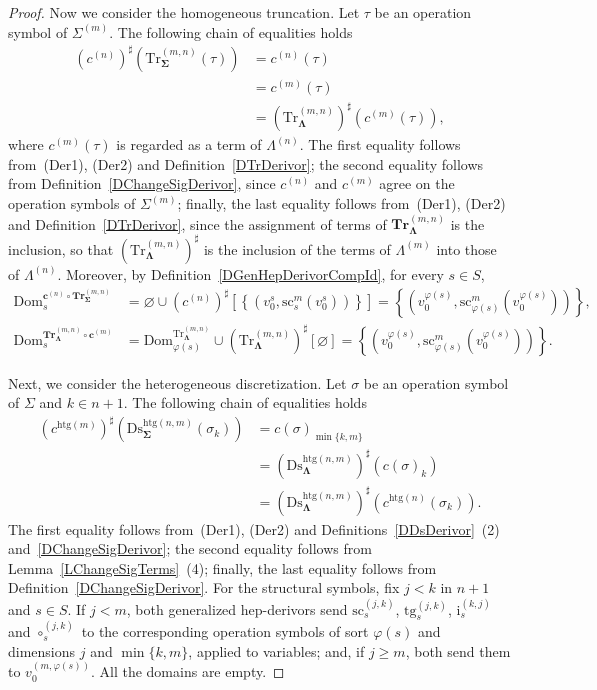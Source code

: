 \documentclass[a4paper, reqno]{amsbook}
\newcommand{\sig}[1]{\mathbf{#1}}             %
\newcommand{\Dom}{\mathrm{Dom}}
\newcommand{\htg}{\mathrm{htg}}                %
\newcommand{\src}{\mathrm{sc}}
\newcommand{\tgt}{\mathrm{tg}}
\newcommand{\Ds}{\mathrm{Ds}}
\newcommand{\Tr}{\mathrm{Tr}}
\newcommand{\bTr}{\mathbf{Tr}}
\theoremstyle{plain}
\theoremstyle{definition}
\begin{document}
\begin{proof}
Now we consider the homogeneous truncation.
Let $\tau$ be an operation symbol of $\Sigma^{(m)}$.
The following chain of equalities holds
\begin{align*}
(c^{(n)})^{\sharp}\left(\Tr^{(m,n)}_{\sig{\Sigma}}(\tau)\right)
&=
c^{(n)}(\tau)
\tag{4}
\\&=
c^{(m)}(\tau)
\tag{5}
\\&=
(\Tr^{(m,n)}_{\sig{\Lambda}})^{\sharp}\left(c^{(m)}(\tau)\right),
\tag{6}
\end{align*}
where $c^{(m)}(\tau)$ is regarded as a term of $\Lambda^{(n)}$.
The first equality follows from~(Der1), (Der2) and Definition~\ref{DTrDerivor}; the second equality follows from Definition~\ref{DChangeSigDerivor}, since $c^{(n)}$ and $c^{(m)}$ agree on the operation symbols of $\Sigma^{(m)}$; finally, the last equality follows from~(Der1), (Der2) and Definition~\ref{DTrDerivor}, since the assignment of terms of $\bTr^{(m,n)}_{\sig{\Lambda}}$ is the inclusion, so that $(\Tr^{(m,n)}_{\sig{\Lambda}})^{\sharp}$ is the inclusion of the terms of $\Lambda^{(m)}$ into those of $\Lambda^{(n)}$.
Moreover, by Definition~\ref{DGenHepDerivorCompId}, for every $s\in S$,
\begin{align*}
\Dom^{\mathbf{c}^{(n)}\circ\bTr^{(m,n)}_{\sig{\Sigma}}}_{s}
&=
\varnothing\cup(c^{(n)})^{\sharp}\left[\left\lbrace\left(v^{s}_{0},\src^{m}_{s}(v^{s}_{0})\right)\right\rbrace\right]
=
\left\lbrace\left(v^{\varphi(s)}_{0},\src^{m}_{\varphi(s)}(v^{\varphi(s)}_{0})\right)\right\rbrace,
\\
\Dom^{\bTr^{(m,n)}_{\sig{\Lambda}}\circ\mathbf{c}^{(m)}}_{s}
&=
\Dom^{\Tr^{(m,n)}_{\sig{\Lambda}}}_{\varphi(s)}\cup(\Tr^{(m,n)}_{\sig{\Lambda}})^{\sharp}[\varnothing]
=
\left\lbrace\left(v^{\varphi(s)}_{0},\src^{m}_{\varphi(s)}(v^{\varphi(s)}_{0})\right)\right\rbrace.
\end{align*}

Next, we consider the heterogeneous discretization.
Let $\sigma$ be an operation symbol of $\Sigma$ and $k\in n+1$.
The following chain of equalities holds
\begin{align*}
(c^{\htg(m)})^{\sharp}\left(\Ds^{\htg(n,m)}_{\sig{\Sigma}}(\sigma_{k})\right)
&=
c(\sigma)_{\min\{k,m\}}
\tag{7}
\\&=
(\Ds^{\htg(n,m)}_{\sig{\Lambda}})^{\sharp}\left(c(\sigma)_{k}\right)
\tag{8}
\\&=
(\Ds^{\htg(n,m)}_{\sig{\Lambda}})^{\sharp}\left(c^{\htg(n)}(\sigma_{k})\right).
\tag{9}
\end{align*}
The first equality follows from~(Der1), (Der2) and Definitions~\ref{DDsDerivor}~(2) and~\ref{DChangeSigDerivor}; the second equality follows from Lemma~\ref{LChangeSigTerms}~(4); finally, the last equality follows from Definition~\ref{DChangeSigDerivor}.
For the structural symbols, fix $j<k$ in $n+1$ and $s\in S$.
If $j<m$, both generalized hep-derivors send $\src^{(j,k)}_{s}$, $\tgt^{(j,k)}_{s}$, $\mathrm{i}^{(k,j)}_{s}$ and $\circ^{(j,k)}_{s}$ to the corresponding operation symbols of sort $\varphi(s)$ and dimensions $j$ and $\min\{k,m\}$, applied to variables; and, if $j\geq m$, both send them to $v^{(m,\varphi(s))}_{0}$.
All the domains are empty.


\end{proof}
\end{document}

